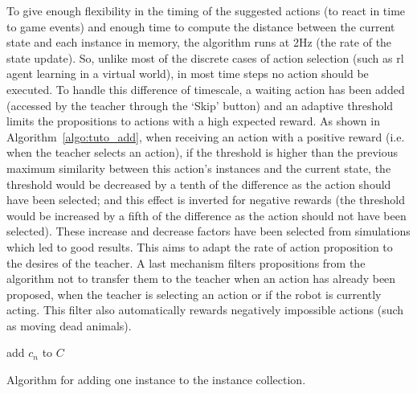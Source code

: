 To give enough flexibility in the timing of the suggested actions (to react in time to game events) and enough time to compute the distance between the current state and each instance in memory, the algorithm runs at 2Hz (the rate of the state update). So, unlike most of the discrete cases of action selection (such as \gls{rl} agent learning in a virtual world), in most time steps no action should be executed. To handle this difference of timescale, a waiting action has been added (accessed by the teacher through the `Skip' button) and an adaptive threshold limits the propositions to actions with a high expected reward. As shown in Algorithm~\ref{algo:tuto_add}, when receiving an action with a positive reward (i.e. when the teacher selects an action), if the threshold is higher than the previous maximum similarity between this action's instances and the current state, the threshold would be decreased by a tenth of the difference as the action should have been selected; and this effect is inverted for negative rewards (the threshold would be increased by a fifth of the difference as the action should not have been selected). These increase and decrease factors have been selected from simulations which led to good results. This aims to adapt the rate of action proposition to the desires of the teacher. A last mechanism filters propositions from the algorithm not to transfer them to the teacher when an action has already been proposed, when the teacher is selecting an action or if the robot is currently acting. This filter also automatically rewards negatively impossible actions (such as moving dead animals).

\begin{algorithm}
	\DontPrintSemicolon
	add	$c_n$ to $C$
	\caption{Algorithm for adding one instance to the instance collection.}
	\label{algo:tuto_add}
\end{algorithm}

